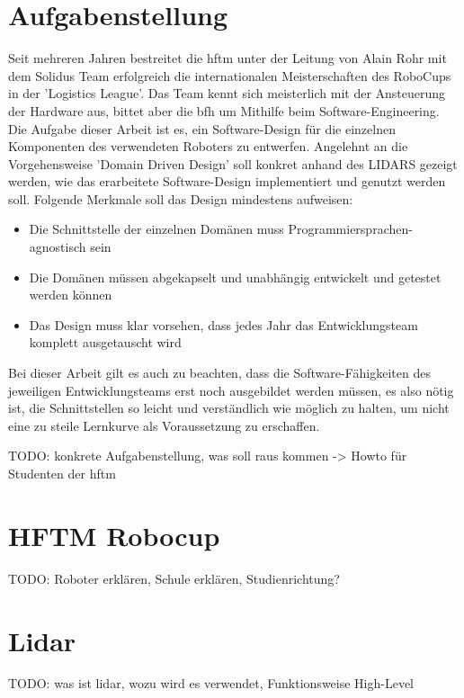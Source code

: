 \documentclass[11pt,english,german]{report}
\begin{document}
\section{Aufgabenstellung}
Seit mehreren Jahren bestreitet die \acrshort{hftm} unter der Leitung von Alain Rohr mit dem Solidus Team erfolgreich die internationalen Meisterschaften des RoboCups in der 'Logistics League'.
Das Team kennt sich meisterlich mit der Ansteuerung der Hardware aus, bittet aber die \acrshort{bfh} um Mithilfe beim Software-Engineering.
Die Aufgabe dieser Arbeit ist es, ein Software-Design für die einzelnen Komponenten des verwendeten Roboters zu entwerfen. Angelehnt an die Vorgehensweise 'Domain Driven Design' soll konkret anhand des LIDARS gezeigt werden, wie das erarbeitete Software-Design implementiert und genutzt werden soll. Folgende Merkmale soll das Design mindestens aufweisen:

\begin{itemize}
	\item
	Die Schnittstelle der einzelnen Domänen muss Programmiersprachen-agnostisch sein
	
	\item
	Die Domänen müssen abgekapselt und unabhängig entwickelt und getestet werden können
	
	\item
	Das Design muss klar vorsehen, dass jedes Jahr das Entwicklungsteam komplett ausgetauscht wird
\end{itemize}
Bei dieser Arbeit gilt es auch zu beachten, dass die Software-Fähigkeiten des jeweiligen Entwicklungsteams erst noch ausgebildet werden müssen, es also nötig ist, die Schnittstellen so leicht und verständlich wie möglich zu halten, um nicht eine zu steile Lernkurve als Voraussetzung zu erschaffen.


\bigskip
TODO:
konkrete Aufgabenstellung, was soll raus kommen -> Howto für Studenten der \acrshort{hftm}

\section{HFTM Robocup}
TODO:
Roboter erklären, Schule erklären, Studienrichtung?

\section{Lidar}
TODO:
was ist \acrshort{lidar}, wozu wird es verwendet, Funktionsweise High-Level
\end{document}
